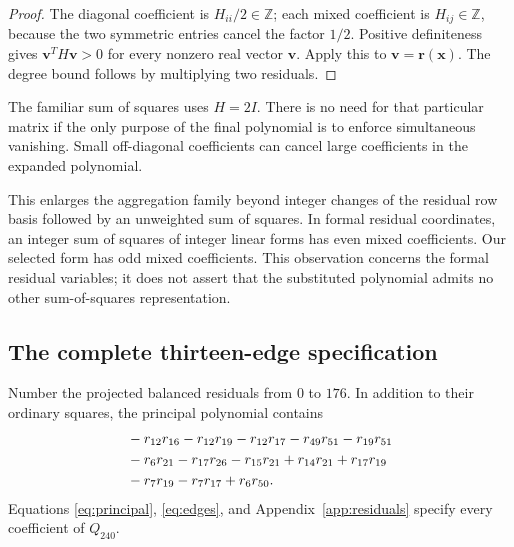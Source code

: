 \documentclass[11pt]{article}
\theoremstyle{remark}\newtheorem{remark}[theorem]{Remark}
\newcommand{\Z}{\mathbb Z}
\begin{document}
\begin{proof}
The diagonal coefficient is $H_{ii}/2\in\Z$; each mixed coefficient is
$H_{ij}\in\Z$, because the two symmetric entries cancel the factor $1/2$.
Positive definiteness gives $\boldsymbol v^TH\boldsymbol v>0$ for every
nonzero real vector $\boldsymbol v$. Apply this to
$\boldsymbol v=\boldsymbol r(\boldsymbol x)$. The degree bound follows
by multiplying two residuals.
\end{proof}

The familiar sum of squares uses $H=2I$. There is no need for that
particular matrix if the only purpose of the final polynomial is to
enforce simultaneous vanishing. Small off-diagonal coefficients can cancel
large coefficients in the expanded polynomial.

This enlarges the aggregation family beyond integer changes of the
residual row basis followed by an unweighted sum of squares. In formal
residual coordinates, an integer sum of squares of integer linear forms
has even mixed coefficients. Our selected form has odd mixed coefficients.
This observation concerns the formal residual variables; it does not
assert that the substituted polynomial admits no other sum-of-squares
representation.

\subsection{The complete thirteen-edge specification}

Number the projected balanced residuals from $0$ to $176$. In addition to
their ordinary squares, the principal polynomial contains
\begin{align}
&-r_{12}r_{16}-r_{12}r_{19}-r_{12}r_{17}
 -r_{49}r_{51}-r_{19}r_{51}\notag\\
&-r_6r_{21}-r_{17}r_{26}-r_{15}r_{21}
 +r_{14}r_{21}+r_{17}r_{19}\notag\\
&-r_7r_{19}-r_7r_{17}+r_6r_{50}.\label{eq:edges}
\end{align}
Equations \eqref{eq:principal}, \eqref{eq:edges}, and
Appendix~\ref{app:residuals} specify every coefficient of $Q_{240}$.
\end{document}
